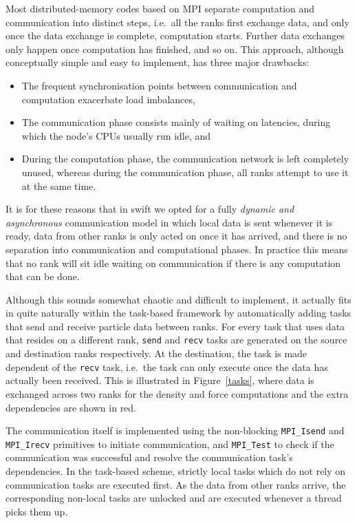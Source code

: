 \documentclass{sig-alternate-05-2015}
\newcommand{\swift}{{\sc swift}\xspace}
\begin{document}
Most distributed-memory codes based on MPI \cite{ref:Snir1998}
separate computation and communication into distinct steps, i.e.~all
the ranks first exchange data, and only once the data exchange is
complete, computation starts. Further data exchanges only happen
once computation has finished, and so on.
This approach, although conceptually simple and easy to implement,
has three major drawbacks:
\begin{itemize}
  \item The frequent synchronisation points between communication
    and computation exacerbate load imbalances,
  \item The communication phase consists mainly of waiting on
    latencies, during which the node's CPUs usually run idle, and
  \item During the computation phase, the communication network
    is left completely unused, whereas during the communication
    phase, all ranks attempt to use it at the same time.
\end{itemize}

It is for these reasons that in \swift we opted for a fully
{\em dynamic and asynchronous} communication model in which local
data is sent whenever it is ready, data from other ranks is
only acted on once it has arrived, and there is no separation into
communication and computational phases.
In practice this means that no rank will sit idle waiting on
communication if there is any computation that can be done.

Although this sounds somewhat chaotic and difficult to implement,
it actually fits in quite naturally within the task-based framework
by automatically adding tasks that send and receive particle data
between ranks.
For every task that uses data that resides on a different rank,
{\tt send} and {\tt recv} tasks are generated on the source
and destination ranks respectively.
At the destination, the task is made dependent of the {\tt recv}
task, i.e.~the task can only execute once the data has actually
been received.
This is illustrated in Figure~\ref{tasks}, where data is exchanged across
two ranks for the density and force computations and the extra
dependencies are shown in red.

The communication itself is implemented using the non-blocking
{\tt MPI\_Isend} and {\tt MPI\_Irecv} primitives to initiate
communication, and {\tt MPI\_Test} to check if the communication
was successful and resolve the communication task's dependencies.
In the task-based scheme, strictly local tasks which do not rely
on communication tasks are executed first.
As the data from other ranks arrive, the corresponding non-local
tasks are unlocked and are executed whenever a thread picks them up.
\end{document}
